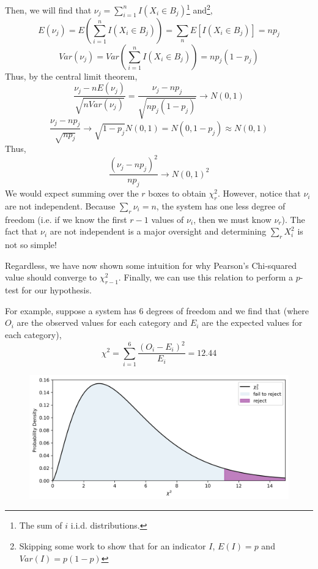 \documentclass[12pt]{article}
\numberwithin{equation}{section}
\theoremstyle{definition}
\begin{document}
Then, we will find that $ \nu_j = \sum_{i=1}^n I(X_i\in B_j) $\footnote{The sum of $ i $ i.i.d. distributions.} and\footnote{Skipping some work to show that for an indicator $I$,  $E(I) = p $ and $ Var(I) = p(1-p) $},
\begin{equation}
		E(\nu_j) = E\left(\sum_{i=1}^n I(X_i\in B_j)\right) = \sum_n E\left[I(X_i\in B_j)\right] = n p_j
\end{equation}
\begin{equation}
		Var(\nu_j) = Var\left(\sum_{i=1}^n I(X_i\in B_j)\right) = n p_j (1-p_j)
\end{equation}
Thus, by the central limit theorem,
\begin{equation}
		\frac{\nu_j - n E(\nu_j)}{\sqrt{n Var(\nu_j)}} = \frac{\nu_j - np_j}{\sqrt{np_j(1-p_j)}} \rightarrow N(0,1)
\end{equation}
\begin{equation}
		\frac{\nu_j - np_j}{\sqrt{np_j}} \rightarrow \sqrt{1-p_j}N(0,1) = N(0, 1-p_j) \approx N(0,1)
\end{equation}
Thus,
\begin{equation}
		\frac{(\nu_j - np_j)^2}{np_j} \rightarrow N(0,1)^2
\end{equation}
We would expect summing over the $ r $ boxes to obtain $ \chi^2_r $. However, notice that $ \nu_i $ are not independent. Because $ \sum_r \nu_i = n $, the system has one less degree of freedom (i.e. if we know the first $ r-1 $ values of $\nu_i$, then we must know $ \nu_r $). The fact that $\nu_i$ are not independent is a major oversight and determining $ \sum_r X_i^2 $ is not so simple!

Regardless, we have now shown some intuition for why Pearson's Chi-squared value should converge to $ \chi^2_{r-1} $. Finally, we can use this relation to perform a $ p $-test for our hypothesis. 

For example, suppose a system has 6 degrees of freedom and we find that (where $ O_i $ are the observed values for each category and $ E_i $ are the expected values for each category),
\begin{equation}
		\chi^2 = \sum_{i=1}^6 \frac{(O_i-E_i)^2}{E_i} = 12.44
\end{equation}
\begin{figure}[H]
	\centering
	\includegraphics[width=15cm] {critical}
\end{figure}
\end{document}
